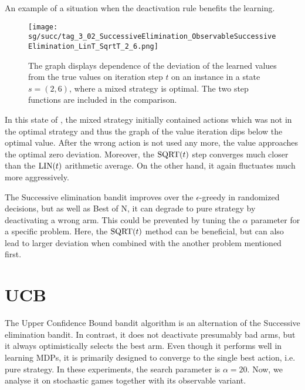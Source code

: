 \documentclass[../main.tex]{subfiles}
\begin{document}
An example of a situation when the deactivation rule benefits the learning.
\begin{figure}[ht]
    \texttt{[image: sg/succ/tag\_3\_02\_SuccessiveElimination\_ObservableSuccessiveElimination\_LinT\_SqrtT\_2\_6.png]}
    \caption[Convergence of the family of Successive elimination algorithms on a state with mixed optimal strategies]{
        The graph displays dependence of the deviation of the learned values from the true values on iteration step $t$ on an instance  in a state $s = \left(2, 6\right)$, where a mixed strategy is optimal.
        The two step functions are included in the comparison.
    }
    \label{apx:sgexp:succ:fig:tag302:26}
\end{figure}
In this state of  , the mixed strategy initially contained actions which was not in the optimal strategy and thus the graph of the value iteration dips below the optimal value.
After the wrong action is not used any more, the value approaches the optimal zero deviation.
Moreover, the $\text{SQRT}(t)$ step converges much closer than the $\text{LIN}(t)$ arithmetic average.
On the other hand, it again fluctuates much more aggressively.

The Successive elimination bandit improves over the $\epsilon$-greedy in randomized decisions, but as well as Best of N, it can degrade to pure strategy by deactivating a wrong arm.
This could be prevented by tuning the $\alpha$ parameter for a specific problem.
Here, the $\text{SQRT}(t)$ method can be beneficial, but can also lead to larger deviation when combined with the another problem mentioned first.

\section{UCB}\label{apx:sgexp:ucb}
The Upper Confidence Bound bandit algorithm is an alternation of the Successive elimination bandit.
In contrast, it does not deactivate presumably bad arms, but it always optimistically selects the best arm.
Even though it performs well in learning MDPs, it is primarily designed to converge to the single best action, i.e. pure strategy.
In these experiments, the search parameter is $\alpha = 20$.
Now, we analyse it on stochastic games together with its observable variant.
\end{document}
